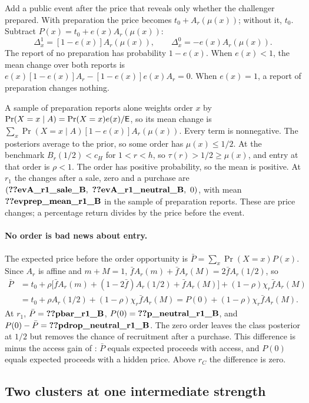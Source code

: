 Add a public event after the price that reveals only whether the challenger prepared. With preparation the price
becomes \(t_0+A_r(\mu(x))\); without it, \(t_0\). Subtract \(P(x)=t_0+e(x)A_r(\mu(x))\):
\[
\Delta_x^1=[1-e(x)]A_r(\mu(x)),\qquad \Delta_x^0=-e(x)A_r(\mu(x)).
\]
The report of no preparation has probability \(1-e(x)\). When \(e(x)<1\), the mean change over both reports is
\(e(x)[1-e(x)]A_r-[1-e(x)]e(x)A_r=0\). When \(e(x)=1\), a report of preparation changes nothing.

A sample of preparation reports alone weights order \(x\) by \(\Pr(X=x\mid A)=\Pr(X=x)e(x)/\mathsf{E}\), so its mean change
is \(\sum_x\Pr(X=x\mid A)[1-e(x)]A_r(\mu(x))\). Every term is nonnegative. The posteriors average to the prior, so
some order has \(\mu(x)\le1/2\). At the benchmark \(B_r(1/2)<c_H\) for \(1<r<h\), so \(\tau(r)>1/2\ge\mu(x)\), and entry
at that order is \(\rho<1\). The order has positive probability, so the mean is positive. At \(r_1\) the changes after
a sale, zero and a purchase are \((\reg{evA_r1_sale_B},\ \reg{evA_r1_neutral_B},\ 0)\), with mean
\(\reg{evprep_mean_r1_B}\) in the sample of preparation reports. These are price changes; a percentage return divides
by the price before the event.

\paragraph{No order is bad news about entry.} The expected price before the order opportunity is
\(\bar P=\sum_x\Pr(X=x)P(x)\). Since \(A_r\) is affine and \(m+M=1\), \(\bar fA_r(m)+\bar fA_r(M)=2\bar fA_r(1/2)\), so
\begin{align*}
\bar P&=t_0+\rho\bigl[\bar fA_r(m)+(1-2\bar f)A_r(1/2)+\bar fA_r(M)\bigr]+(1-\rho)\chi_r\bar fA_r(M)\\
&=t_0+\rho A_r(1/2)+(1-\rho)\chi_r\bar fA_r(M)=P(0)+(1-\rho)\chi_r\bar fA_r(M).
\end{align*}
At \(r_1\), \(\bar P=\reg{pbar_r1_B}\), \(P(0)=\reg{p_neutral_r1_B}\), and \(P(0)-\bar P=\reg{pdrop_neutral_r1_B}\). The zero
order leaves the class posterior at \(1/2\) but removes the chance of recruitment after a purchase. This difference is
minus the access gain of : \(\bar P\) equals expected proceeds with access, and \(P(0)\)
equals expected proceeds with a hidden price. Above \(r_C\) the difference is zero.

\subsection{Two clusters at one intermediate strength}\label{sec:12_empirical-clusters}

